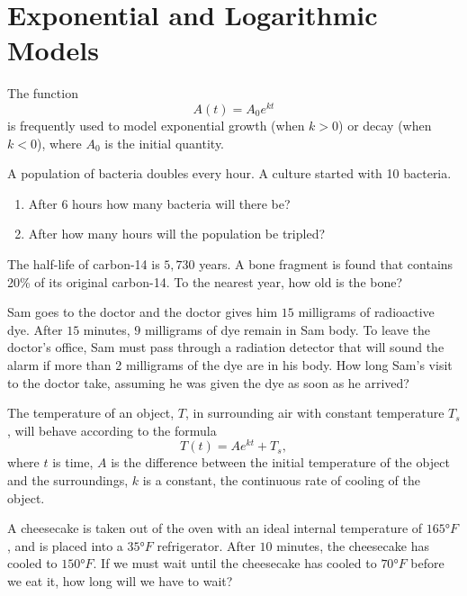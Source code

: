\newpage
\section{Exponential and Logarithmic Models}

\begin{howto}
  The function
  \[A(t)=A_0e^{kt}\]
is frequently used to model exponential growth (when $k>0$) or decay (when $k<0$), where $A_0$ is the initial quantity.
\end{howto}

\begin{example}
  A population of bacteria doubles every hour. A culture started with 10 bacteria.
  \begin{enumerate}
    \item After 6 hours how many bacteria will there be?
    \item After how many hours will the population be tripled?  
  \end{enumerate}
\end{example}


\begin{example}
  The half-life of carbon-14 is $5,730$ years. A bone fragment is found that contains  20\% of its original carbon-14. To the nearest year, how old is the bone?
\end{example}

\newpage

\begin{example}
  Sam goes to the doctor and the doctor gives him $15$ milligrams of radioactive dye. After $15$ minutes, $9$ milligrams of dye remain in Sam body. To leave the doctor's office, Sam must pass through a radiation detector that will sound the alarm if more than 2 milligrams of the dye are in his body. How long Sam's visit to the doctor take, assuming he was given the dye as soon as he arrived?
\end{example}

\begin{howto}
  The temperature of an object, $T$, in surrounding air with constant temperature $T_s$, will behave according to the formula
  $$T(t)=Ae^{kt}+T_s,$$
where $t$ is time, $A$ is the difference between the initial temperature of the object and the surroundings, $k$ is a constant, the continuous rate of cooling of the object.
\end{howto}

\begin{example}
  A cheesecake is taken out of the oven with an ideal internal temperature of $165\unit{\degree F}$, and is placed into a $35\unit{\degree F}$ refrigerator. After $10$ minutes, the cheesecake has cooled to $150\unit{\degree F}$. If we must wait until the cheesecake has cooled to $70\unit{\degree F}$ before we eat it, how long will we have to wait?
\end{example}

